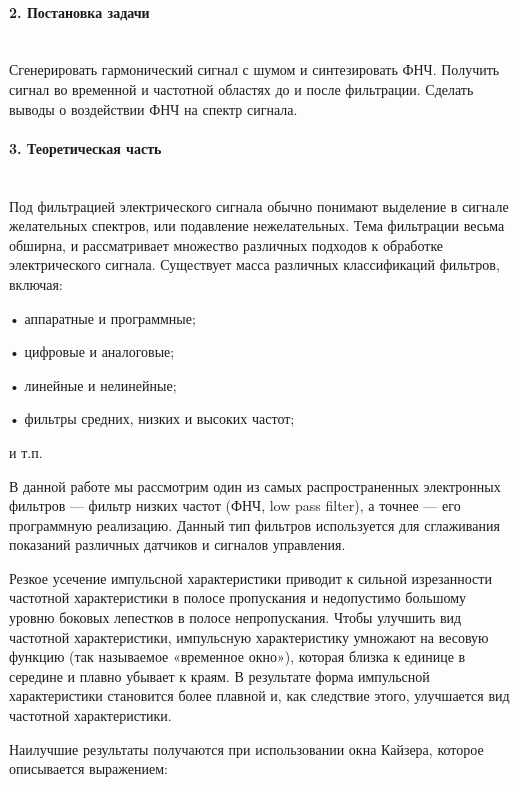 \documentclass[12pt,a4paper]{report}
\begin{document}
\paragraph{2. Постановка задачи\\\\}
Сгенерировать гармонический сигнал с шумом и синтезировать ФНЧ. Получить сигнал во временной и частотной областях до и после фильтрации. Сделать выводы о воздействии ФНЧ на спектр сигнала.

\paragraph{3. Теоретическая часть \\\\}
Под фильтрацией электрического сигнала обычно понимают выделение в сигнале желательных спектров, или подавление нежелательных. Тема фильтрации весьма обширна, и рассматривает множество различных подходов к обработке электрического сигнала. Существует масса различных классификаций фильтров, включая:

• аппаратные и программные;

• цифровые и аналоговые;

• линейные и нелинейные;

• фильтры средних, низких и высоких частот;

и т.п.

В данной работе мы рассмотрим один из самых распространенных электронных фильтров — фильтр низких частот (ФНЧ, low pass filter), а точнее — его программную реализацию. Данный тип фильтров используется для сглаживания показаний различных датчиков и сигналов управления.

Резкое усечение импульсной характеристики приводит к сильной изрезанности частотной характеристики в полосе пропускания и недопустимо большому уровню боковых лепестков в полосе непропускания. Чтобы улучшить вид частотной характеристики, импульсную характеристику умножают на весовую функцию (так называемое «временное окно»), которая близка к единице в середине и плавно убывает к краям. В результате форма импульсной характеристики становится более плавной и, как следствие этого, улучшается вид частотной характеристики.

Наилучшие результаты получаются при использовании окна Кайзера, которое описывается выражением:

\begin{figure}[h!]
\end{figure}
\end{document}
